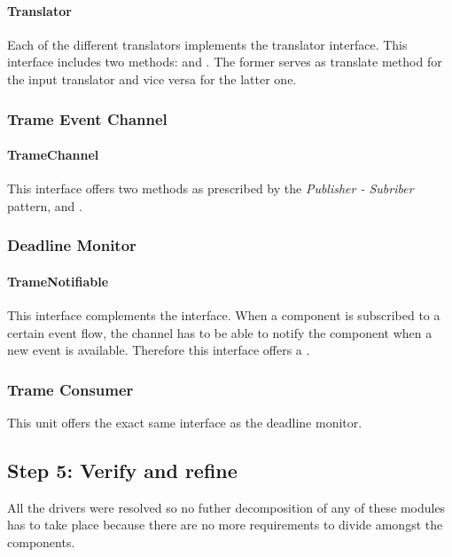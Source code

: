 \paragraph{Translator}

\npar Each of the different translators implements the 
translator interface. This interface includes two methods:
 and
. The former serves as translate
method for the input translator and vice versa for the latter one.

\subsubsection{Trame Event Channel}

\paragraph{TrameChannel} %

\npar This interface offers two methods as prescribed by the \emph{Publisher -
Subriber} pattern,  and
.

\subsubsection{Deadline Monitor}

\paragraph{TrameNotifiable}

\npar This interface complements the  interface. When a
component is subscribed to a certain event flow, the channel has to be able to
notify the component when a new event is available. Therefore this interface
offers a .

\subsubsection{Trame Consumer}

\npar This unit offers the exact same interface as the deadline monitor.


\subsection{Step 5: Verify and refine}
\label{add:it2/verification}

\npar All the drivers were resolved so no futher decomposition of any of these
modules has to take place because there are no more requirements to divide
amongst the components. 
